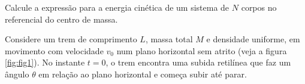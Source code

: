 \documentclass[]{IMTexam}
\begin{document}
\begin{questions}
\begin{parts}
		\begin{solution}

		\end{solution}
	\end{parts}



	\question Calcule a expressão para a energia cinética de um sistema de $ N $ corpos no referencial do centro de massa.

	\begin{solution}

	\end{solution}



	\question Considere um trem de comprimento $ L $, massa total $ M $ e densidade uniforme, em movimento com velocidade $ v_0 $ num plano horizontal sem atrito (veja a figura \ref{fig:fig1}). No instante $ t = 0 $, o trem encontra uma subida retilínea que faz um ângulo $ \theta $ em relação ao plano horizontal e começa subir até parar.

\end{questions}
\end{document}
